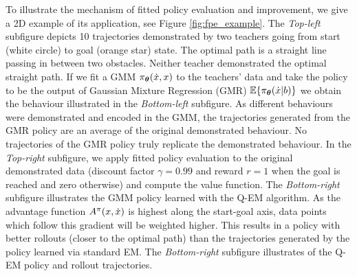 To illustrate the mechanism of fitted policy evaluation and improvement, we give a 2D example 
of its application, see Figure \ref{fig:fpe_example}. The \textit{Top-left} subfigure
depicts 10 trajectories demonstrated by two teachers going from start (white circle) to goal (orange star) state. 
The optimal path is a straight line passing in between two obstacles. 
Neither teacher demonstrated the optimal straight path. If we fit a GMM 
$\pi_{\boldsymbol{\theta}}(\dot{x},x)$ to the teachers' data and take the policy to be the output of 
Gaussian Mixture Regression (GMR) $\mathbb{E}\{\pi_{\boldsymbol{\theta}}(\dot{x}|b)\}$ we obtain the behaviour 
illustrated in the \textit{Bottom-left} subfigure. As different behaviours were demonstrated and encoded 
in the GMM, the trajectories generated from the GMR policy are an average of the original demonstrated 
behaviour. No trajectories of the GMR policy truly replicate the demonstrated behaviour. In the \textit{Top-right}
subfigure, we apply fitted policy evaluation to the original demonstrated data (discount 
factor $\gamma=0.99$ and reward $r=1$ when the goal is reached and zero otherwise) and compute the value function.
The \textit{Bottom-right} subfigure illustrates the GMM policy learned with the Q-EM algorithm. As 
the advantage function $ A^{\pi}(x,\dot{x})$ is highest along the start-goal axis, data points
which follow this gradient will be weighted higher. This results in a policy with better 
rollouts (closer to the optimal path) than the trajectories generated by the policy learned via standard EM. The \textit{Bottom-right} subfigure illustrates of 
the Q-EM policy and rollout trajectories.


